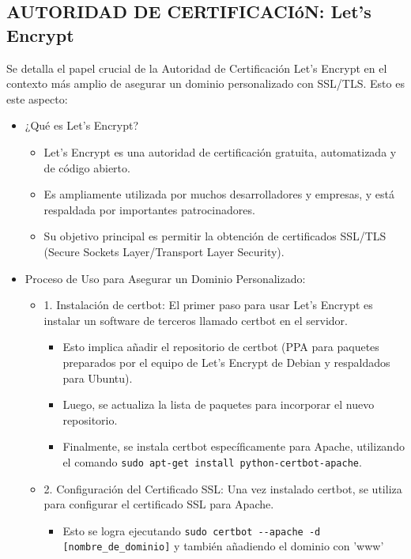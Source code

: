 \documentclass{report}
\begin{document}
\subsection{AUTORIDAD DE CERTIFICACIóN: Let's Encrypt}
Se detalla el papel crucial de la Autoridad de Certificación Let's Encrypt en el contexto más amplio 
de asegurar un dominio personalizado con SSL/TLS.
Esto es este aspecto:
\begin{itemize}
    \item ¿Qué es Let's Encrypt?
        \begin{itemize}
            \item Let's Encrypt es una autoridad de certificación gratuita, automatizada y de código abierto.
            \item Es ampliamente utilizada por muchos desarrolladores y empresas, y está respaldada por importantes patrocinadores.
            \item Su objetivo principal es permitir la obtención de certificados SSL/TLS (Secure Sockets Layer/Transport Layer Security).
        \end{itemize}
    \item Proceso de Uso para Asegurar un Dominio Personalizado:
        \begin{itemize}
            \item 1. Instalación de certbot: El primer paso para usar Let's Encrypt es instalar un software de terceros llamado certbot en el servidor.
                \begin{itemize}
                    \item Esto implica añadir el repositorio de certbot (PPA para paquetes preparados por el equipo de Let's Encrypt de 
                    Debian y respaldados para Ubuntu).
                    \item Luego, se actualiza la lista de paquetes para incorporar el nuevo repositorio.
                    \item Finalmente, se instala certbot específicamente para Apache, utilizando el comando \verb|sudo apt-get install python-certbot-apache|.
                \end{itemize}
            \item 2. Configuración del Certificado SSL: Una vez instalado certbot, se utiliza para configurar el certificado SSL para Apache.
                \begin{itemize}
                    \item Esto se logra ejecutando \verb|sudo certbot --apache -d [nombre_de_dominio]| y también añadiendo el dominio con 'www' 

\end{itemize}
\end{itemize}
\end{itemize}
\end{document}

